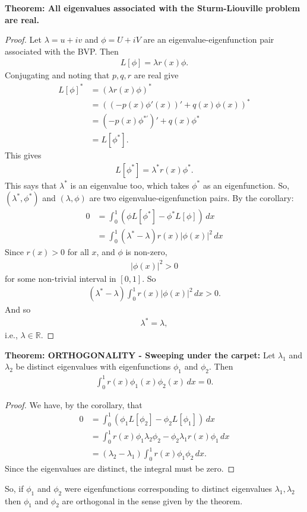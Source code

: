 \documentclass{book}
\theoremstyle{definition}
\begin{document}
	\textbf{Theorem: All eigenvalues associated with the Sturm-Liouville problem are real.}  
\begin{proof}
	Let $\lambda = u + iv$ and $\phi =U + iV$ are an eigenvalue-eigenfunction pair associated with the BVP. Then
	\begin{align*}
	L[\phi] = \lambda r(x)\phi.
	\end{align*}
	Conjugating and noting that $p,q,r$ are real give	
	\begin{align*}
	L[\phi]^* &= (\lambda r(x)\phi)^*\\
	&= ((-p(x)\phi'(x))' + q(x)\phi(x))^*\\
	&= (-p(x)\phi^{*'})' + q(x)\phi^*\\
	&= L[\phi^*].
	\end{align*}
	This gives
	\begin{align*}
	L[\phi^*] = \lambda^* r(x)\phi^*.
	\end{align*}
	This says that $\lambda^*$ is an eigenvalue too, which takes $\phi^*$ as an eigenfunction. So, $(\lambda^*,\phi^*)$ and $(\lambda,\phi)$ are two eigenvalue-eigenfunction pairs. By the corollary:
	\begin{align*}
	0 &= \int_{0}^1 (\phi L[\phi^*] - \phi^* L[\phi])\,dx\\
	&= \int^1_0 (\lambda^* -\lambda)r(x)\vert \phi(x)\vert^2\,dx
	\end{align*}
	Since $r(x) > 0$ for all $x$, and $\phi$ is non-zero, 
	\begin{align*}
	\vert \phi(x)\vert^2 > 0
	\end{align*}
	for some non-trivial interval in $[0,1]$. So
	\begin{align*}
	(\lambda^* -\lambda)\int^1_0 r(x)\vert \phi(x)\vert^2\,dx > 0.
	\end{align*}
	And so 
	\begin{align*}
	\lambda^* = \lambda,
	\end{align*}
	i.e., $\lambda \in \mathbb{R}$.
\end{proof}



	\textbf{Theorem: ORTHOGONALITY - Sweeping under the carpet:} Let $\lambda_1$ and $\lambda_2$ be distinct eigenvalues with eigenfunctions $\phi_1$ and $\phi_2$. Then 
	\begin{align*}
	\int^1_0 r(x)\phi_1(x)\phi_2(x)\,dx = 0.
	\end{align*} 
	\begin{proof}
		We have, by the corollary, that
		\begin{align*}
		0 &= \int^1_0 (\phi_1L[\phi_2] - \phi_2L[\phi_1])\,dx\\
		&= \int_{0}^1 r(x)\phi_1\lambda_2\phi_2 - \phi_2\lambda_1r(x)\phi_1\,dx\\
		&= (\lambda_2 - \lambda_1)\int^1_0 r(x)\phi_1\phi_2\,dx.
		\end{align*}
		Since the eigenvalues are distinct, the integral must be zero.
	\end{proof}
So, if $\phi_1$ and $\phi_2$ were eigenfunctions corresponding to distinct eigenvalues $\lambda_1, \lambda_2$ then $\phi_1$ and $\phi_2$ are orthogonal in the sense given by the theorem. \\
\end{document}
